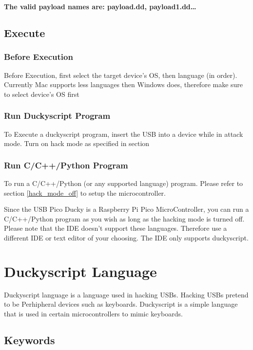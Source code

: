\documentclass[a4paper,12pt]{article}
\begin{document}
\textbf{The valid payload names are: payload.dd, payload1.dd\dots}

\subsection{Execute}

\subsubsection{Before Execution}

Before Execution, first select the target device's OS, then language (in order). Currently Mac supports less languages then Windows does, therefore make sure to select device's OS first

\subsubsection{Run Duckyscript Program}

To Execute a duckyscript program, insert the USB into a device while in attack mode. Turn on hack mode as specified in section \label{hack_mode_on}

\subsubsection{Run C/C++/Python Program}

To run a C/C++/Python (or any supported language) program. Please refer to section \ref{hack_mode_off} to setup the microcontroller.

Since the USB Pico Ducky is a Raspberry Pi Pico MicroController, you can run a C/C++/Python program as you wish as long as the hacking mode is turned off. Please note that the IDE doesn't support these languages. Therefore use a different IDE or text editor of your choosing. The IDE only supports duckyscript.

\section{Duckyscript Language}

Duckyscript language is a language used in hacking USBs. Hacking USBs pretend to be Perhipheral devices such as keyboards. Duckyscript is a simple language that is used in certain microcontrollers to mimic keyboards.

\subsection{Keywords}\label{all_keywords}
\end{document}
